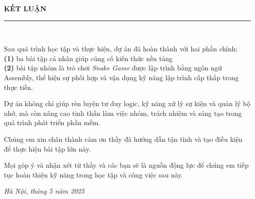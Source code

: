 \newpage
\thispagestyle{empty}

\vspace*{2cm}

\begin{center}
    {\Huge \bfseries \textcolor{blue!60!black}{KẾT LUẬN}}\\[1cm]
    
    \rule{0.6\linewidth}{1pt}\\[1cm]

    \begin{tcolorbox}[colback=blue!5!white, colframe=blue!30!black,
        width=0.85\textwidth, sharp corners=south, boxrule=0.8pt,
        drop shadow southwest, enhanced, fonttitle=\bfseries]
        \Large
        Sau quá trình học tập và thực hiện, dự án đã hoàn thành với hai phần chính:\\ \textbf{(1)} ba bài tập cá nhân giúp củng cố kiến thức nền tảng\\ \textbf{(2)} bài tập nhóm là trò chơi \textit{Snake Game} được lập trình bằng ngôn ngữ Assembly, thể hiện sự phối hợp và vận dụng kỹ năng lập trình cấp thấp trong thực tiễn.

        \vspace{0.5cm}

        Dự án không chỉ giúp rèn luyện tư duy logic, kỹ năng xử lý sự kiện và quản lý bộ nhớ, mà còn nâng cao tinh thần làm việc nhóm, trách nhiệm và sáng tạo trong quá trình phát triển phần mềm.

        \vspace{0.5cm}

        Chúng em xin chân thành cảm ơn thầy đã hướng dẫn tận tình và tạo điều kiện để thực hiện bài tập lớn này.

        \vspace{0.5cm}

        Mọi góp ý và nhận xét từ thầy và các bạn sẽ là nguồn động lực để chúng em tiếp tục hoàn thiện kỹ năng trong học tập và công việc sau này.
    \end{tcolorbox}

    \vfill

    {\large \textit{Hà Nội, tháng 5 năm 2025}}

\end{center}

